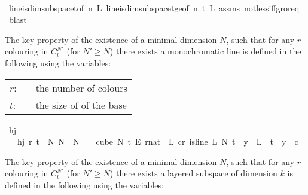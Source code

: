 \begin{isabellebody}
%
\isadelimproof
\ \ %
\endisadelimproof
%
\isatagproof
{}\isamarkupfalse%
\ line{\isacharunderscore}{\kern0pt}is{\isacharunderscore}{\kern0pt}dim{}{\isacharunderscore}{\kern0pt}subspace{\isacharunderscore}{\kern0pt}t{\isacharunderscore}{\kern0pt}{}{\isacharbrackleft}{\kern0pt}of\ n\ L{\isacharbrackright}{\kern0pt}\ line{\isacharunderscore}{\kern0pt}is{\isacharunderscore}{\kern0pt}dim{}{\isacharunderscore}{\kern0pt}subspace{\isacharunderscore}{\kern0pt}t{\isacharunderscore}{\kern0pt}ge{\isacharunderscore}{\kern0pt}{}{\isacharbrackleft}{\kern0pt}of\ n\ t\ L{\isacharbrackright}{\kern0pt}\ assms\ not{\isacharunderscore}{\kern0pt}less{\isacharunderscore}{\kern0pt}iff{\isacharunderscore}{\kern0pt}gr{\isacharunderscore}{\kern0pt}or{\isacharunderscore}{\kern0pt}eq\ \isamarkupfalse%
\ blast%
\endisatagproof
{\isafoldproof}%
%
\isadelimproof
%
\endisadelimproof
%
\begin{isamarkuptext}%
The key property of the existence of a minimal dimension $N$, such that for any $r$-colouring in $C^{N'}_t$ (for $N' \geq N$) there exists a monochromatic line is defined in the following using the variables:

\begin{tabular}{llp{8cm}}
$r$:& \isa{nat}& the number of colours\\
$t$:& \isa{nat}& the size of of the base
\end{tabular}%
\end{isamarkuptext}\isamarkuptrue%
\isamarkupfalse%
\ hj\ \isanewline
\ \ \ {\isachardoublequoteopen}hj\ r\ t\ {\isasymequiv}\ {\isacharparenleft}{\kern0pt}{\isasymexists}N{\isachargreater}{\kern0pt}{}{\isachardot}{\kern0pt}\ {\isasymforall}N{\isacharprime}{\kern0pt}\ {\isasymge}\ N{\isachardot}{\kern0pt}\ {\isasymforall}{\isasymchi}{\isachardot}{\kern0pt}\ {\isasymchi}\ {\isasymin}\ {\isacharparenleft}{\kern0pt}cube\ N{\isacharprime}{\kern0pt}\ t{\isacharparenright}{\kern0pt}\ {\isasymrightarrow}\isactrlsub E\ {\isacharbraceleft}{\kern0pt}{\isachardot}{\kern0pt}{\isachardot}{\kern0pt}{\isacharless}{\kern0pt}r{\isacharcolon}{\kern0pt}{\isacharcolon}{\kern0pt}nat{\isacharbraceright}{\kern0pt}\ {\isasymlongrightarrow}\ {\isacharparenleft}{\kern0pt}{\isasymexists}L{\isachardot}{\kern0pt}\ {\isasymexists}c{\isacharless}{\kern0pt}r{\isachardot}{\kern0pt}\ is{\isacharunderscore}{\kern0pt}line\ L\ N{\isacharprime}{\kern0pt}\ t\ {\isasymand}\ {\isacharparenleft}{\kern0pt}{\isasymforall}y\ {\isasymin}\ L\ {\isacharbackquote}{\kern0pt}\ {\isacharbraceleft}{\kern0pt}{\isachardot}{\kern0pt}{\isachardot}{\kern0pt}{\isacharless}{\kern0pt}t{\isacharbraceright}{\kern0pt}{\isachardot}{\kern0pt}\ {\isasymchi}\ y\ {\isacharequal}{\kern0pt}\ c{\isacharparenright}{\kern0pt}{\isacharparenright}{\kern0pt}{\isacharparenright}{\kern0pt}{\isachardoublequoteclose}%
\begin{isamarkuptext}%
The key property of the existence of a minimal dimension $N$, such that for any $r$-colouring in $C^{N'}_t$ (for $N' \geq N$) there exists a layered subspace of dimension $k$ is defined in the following using the variables:


\end{isamarkuptext}
\end{isabellebody}
